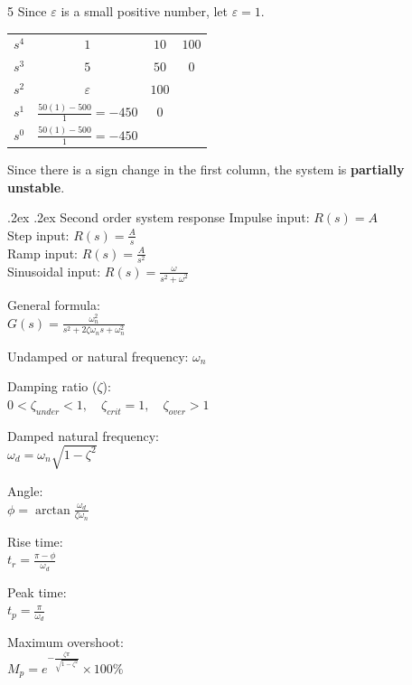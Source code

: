 \documentclass[10pt,landscape,a4paper]{article}
\makeatletter
\renewcommand{\section}{\@startsection{section}{1}{0mm}%
  {.2ex}%
  {.2ex}%
  {\color{myblue}\sffamily\small\bfseries}}
\makeatother
\begin{document}
\begin{multicols*}{5}
  Since \(\varepsilon\) is a small positive number, let \(\varepsilon = 1\).

  \begin{tabular}{@{}c|ccc}
    \hline
    \(s^4\) & \(1\) & \(10\) & \(100\) \\
    \(s^3\) & \(5\) & \(50\) & \(0\) \\
    \(s^2\) & \(\varepsilon\) & \(100\) \\
    \(s^1\) & \(\frac{50(1) - 500}{1} = -450\) & \(0\) \\
    \(s^0\) & \(\frac{50(1) - 500}{1} = -450\) \\
  \end{tabular}

  Since there is a sign change in the first column, the system is \textbf{partially unstable}.

  \vspace{20em}


  \section{Second order system response}
  Impulse input: \(R(s) = A\) \\
  Step input: \(R(s) = \frac{A}{s}\) \\
  Ramp input: \(R(s) = \frac{A}{s^2}\) \\
  Sinusoidal input: \(R(s) = \frac{\omega}{s^2 + \omega^2}\)

  General formula: \\
  \(G(s) = \frac{\omega_n^2}{s^2 + 2 \zeta \omega_n s + \omega_n^2}\)

  Undamped or natural frequency: \(\omega_n\)

  Damping ratio (\(\zeta\)): \\
  \(0 < \zeta_{under} < 1, \quad \zeta_{crit} = 1, \quad \zeta_{over} > 1\)

  Damped natural frequency: \\
  \(\omega_d = \omega_n \sqrt{1 - \zeta^2}\)

  Angle: \\
 \(\phi = \arctan \frac{\omega_d}{\zeta \omega_n}\)

  Rise time: \\
  \(t_r = \frac{\pi - \phi}{\omega_d}\)

  Peak time: \\
  \(t_p = \frac{\pi}{\omega_d}\)

  Maximum overshoot: \\
  \(M_p = e^{- \frac{\zeta \pi}{\sqrt{1 - \zeta^2}}} \times 100 \%\)


\end{multicols*}
\end{document}
